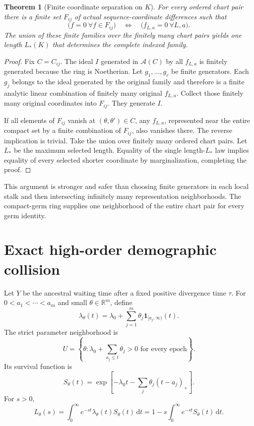 \documentclass[11pt]{article}
\newtheorem{theorem}{Theorem}[section]
\newcommand{\dd}{\,\mathrm d}
\newcommand{\R}{\mathbb R}
\newcommand{\cA}{\mathcal A}
\begin{document}
\begin{theorem}[Finite coordinate separation on $K$]
For every ordered chart pair there is a finite set $F_{ij}$ of actual sequence-coordinate differences such that
\[
\bigl(f=0\ \forall f\in F_{ij}\bigr)
\quad\Longleftrightarrow\quad
\bigl(f_{L,a}=0\ \forall L,a\bigr).
\]
The union of these finite families over the finitely many chart pairs yields one length $L_*(K)$ that determines the complete indexed family.
\end{theorem}

\begin{proof}
Fix $C=C_{ij}$.  The ideal $I$ generated in $\cA(C)$ by all $f_{L,a}$ is finitely generated because the ring is Noetherian.  Let $g_1,\ldots,g_r$ be finite generators.  Each $g_j$ belongs to the ideal generated by the original family and therefore is a finite analytic linear combination of finitely many original $f_{L,a}$.  Collect those finitely many original coordinates into $F_{ij}$.  They generate $I$.

If all elements of $F_{ij}$ vanish at $(\theta,\theta')\in C$, any $f_{L,a}$, represented near the entire compact set by a finite combination of $F_{ij}$, also vanishes there.  The reverse implication is trivial.  Take the union over finitely many ordered chart pairs.  Let $L_*$ be the maximum selected length.  Equality of the single length-$L_*$ law implies equality of every selected shorter coordinate by marginalization, completing the proof.
\end{proof}

This argument is stronger and safer than choosing finite generators in each local stalk and then intersecting infinitely many representation neighborhoods.  The compact-germ ring supplies one neighborhood of the entire chart pair for every germ identity.

\section{Exact high-order demographic collision}

Let $Y$ be the ancestral waiting time after a fixed positive divergence time $\tau$.  For $0<a_1<\cdots<a_m$ and small $\theta\in\R^m$, define
\[
\lambda_\theta(t)=\lambda_0+\sum_{j=1}^m\theta_j\mathbf1_{[a_j,\infty)}(t).
\]
The strict parameter neighborhood is
\[
U=\left\{\theta:\lambda_0+\sum_{a_j\le t}\theta_j>0\text{ for every epoch}\right\}.
\]
Its survival function is
\[
S_\theta(t)=\exp\left[-\lambda_0t-\sum_j\theta_j(t-a_j)_+\right].
\]
For $s>0$,
\[
L_\theta(s)=\int_0^\infty e^{-st}\lambda_\theta(t)S_\theta(t)\dd t
=1-s\int_0^\infty e^{-st}S_\theta(t)\dd t.
\]
\end{document}
